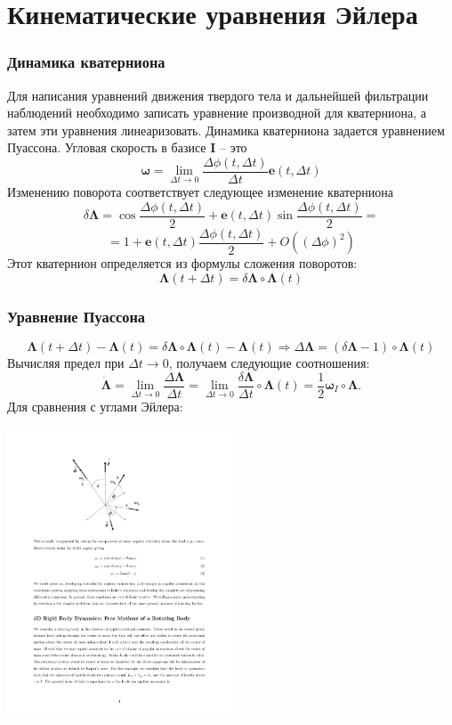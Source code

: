 \documentclass[utf8]{beamer}
\begin{document}
\section{Кинематические уравнения Эйлера}
\begin{frame}
\frametitle{Динамика кватерниона}
Для написания уравнений движения твердого тела и дальнейшей фильтрации
наблюдений необходимо записать уравнение производной для кватерниона, а затем
эти уравнения линеаризовать. Динамика кватерниона задается уравнением
Пуассона. Угловая скорость в базисе $\mathbf{I}$ -- это
$$
\mathbf{\omega}=\lim_{\Delta t \rightarrow 0}\frac{\Delta\phi\left(t,\Delta t\right)}{\Delta
t}\mathbf{e}\left(t,\Delta t\right)
$$
Изменению поворота соответствует следующее изменение кватерниона
$$
\delta\mathbf{\Lambda}=\cos{\frac{\Delta\phi\left(t,\Delta t\right)}{2}} + \mathbf{e}\left(t,\Delta t\right)
\sin{\frac{\Delta\phi\left(t,\Delta t\right)}{2}} =
$$
$$
= 1 + \mathbf{e}\left(t,\Delta t\right)
{\frac{\Delta\phi\left(t,\Delta t\right)}{2}} + O\left(\left(\Delta\phi\right)^2\right)
$$
Этот кватернион определяется из формулы сложения поворотов:
$$
\mathbf{\Lambda}\left(t+\Delta t\right) = \delta \mathbf{\Lambda} \circ
\mathbf{\Lambda}\left(t\right)
$$
\end{frame}
\begin{frame}
\frametitle{Уравнение Пуассона}
$$
\mathbf{\Lambda}\left(t+\Delta t\right) - \mathbf{\Lambda}\left(t\right)
=\delta \mathbf{\Lambda}\circ\mathbf{\Lambda}\left(t\right)
-\mathbf{\Lambda}\left(t\right) \Rightarrow \Delta \mathbf{\Lambda} =
\left(\delta \mathbf{\Lambda}-1\right)\circ \mathbf{\Lambda}\left(t\right)
$$
Вычисляя предел при $\Delta t \rightarrow 0$, получаем следующие соотношения:
$$
\dot{\mathbf{\Lambda}} = \lim_{\Delta t \rightarrow 0}{\frac{\Delta
\mathbf{\Lambda}}{\Delta t}} =  \lim_{\Delta t \rightarrow 0}{\frac{\delta
\mathbf{\Lambda}}{\Delta t}}\circ \mathbf{\Lambda}\left( t \right) =
\frac{1}{2}\mathbf{\omega}_I\circ\mathbf{\Lambda}.
$$
Для сравнения с углами Эйлера:
\begin{center}
    \includegraphics[width=0.5\textwidth]{pic/euler_dot.pdf}
\end{center}
\end{frame}
\end{document}
